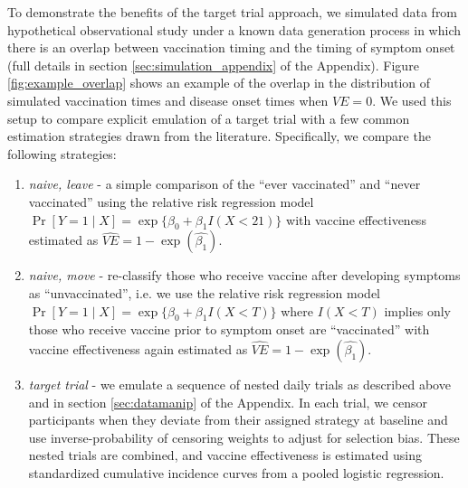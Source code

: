 \documentclass[11pt]{article}
\begin{document}
To demonstrate the benefits of the target trial approach, we simulated data from hypothetical observational study under a known data generation process in which there is an overlap between vaccination timing and the timing of symptom onset (full details in section \ref{sec:simulation_appendix} of the Appendix). Figure \ref{fig:example_overlap} shows an example of the overlap in the distribution of simulated vaccination times and disease onset times when $VE = 0$. We used this setup to compare explicit emulation of a target trial with a few common estimation strategies drawn from the literature. Specifically, we compare the following strategies:
    \begin{enumerate}
        \item \textit{naive, leave} - a simple comparison of the ``ever vaccinated'' and ``never vaccinated'' using the relative risk regression model $\Pr[Y = 1 \mid X] = \operatorname{exp}\{\beta_0 + \beta_1 I(X < 21)\}$ with vaccine effectiveness estimated as $\widehat{VE} = 1 - \exp(\widehat{\beta_1})$.
        \item \textit{naive, move} - re-classify those who receive vaccine after developing symptoms  as ``unvaccinated'', i.e. we use the relative risk regression model $\Pr[Y = 1 \mid X] = \operatorname{exp}\{\beta_0 + \beta_1 I(X < T)\}$ where $I(X<T)$ implies only those who receive vaccine prior to symptom onset are ``vaccinated'' with vaccine effectiveness again estimated as $\widehat{VE} = 1 - \exp(\widehat{\beta_1})$.
        \item \textit{target trial} - we emulate a sequence of nested daily trials as described above and in section \ref{sec:datamanip} of the Appendix. In each trial, we censor participants when they deviate from their assigned strategy at baseline and use inverse-probability of censoring weights to adjust for selection bias. These nested trials are combined, and vaccine effectiveness is estimated using standardized cumulative incidence curves from a pooled logistic regression.
    \end{enumerate}
    
\end{document}
